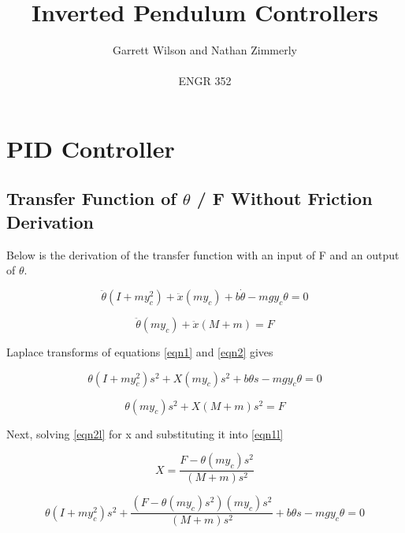 \documentclass{article}
\begin{document}
\title{Inverted Pendulum Controllers}
\author{Garrett Wilson and Nathan Zimmerly \\ \\
ENGR 352}
\maketitle

\clearpage

\tableofcontents

\pagebreak

\section{PID Controller}
\subsection{Transfer Function of $\theta$ / F Without Friction Derivation}
Below is the derivation of the transfer function with an input of F and an output of $\theta$.


\begin{equation} 
\label{eqn1}
\ddot \theta (I+m y_c^2)+\ddot x (m y_c)+b \dot \theta - m g y_c \theta = 0 
\end{equation}


\begin{equation} 
\label{eqn2}
\ddot \theta(m y_c) + \ddot x(M+m) = F
\end{equation}

Laplace transforms of equations \ref{eqn1} and \ref{eqn2} gives

\begin{equation} 
\label{eqn1l}
\theta (I+m y_c^2) s^2+ X (m y_c) s^2+b \theta s - m g y_c \theta = 0 
\end{equation}


\begin{equation}  
\label{eqn2l}
\theta (m y_c) s^2+ X (M+m) s^2= F
\end{equation}

Next, solving \ref{eqn2l} for x and substituting it into \ref{eqn1l}

\begin{equation}  
\label{eqn2lb}
X = \frac{F - \theta (m y_c) s^2}{(M+m) s^2}
\end{equation}

\begin{equation} 
\label{eqn3}
\theta (I+m y_c^2) s^2+ \frac{(F - \theta (m y_c) s^2)(m y_c) s^2}{(M+m) s^2} + b \theta s - m g y_c \theta = 0 
\end{equation}
\end{document}
